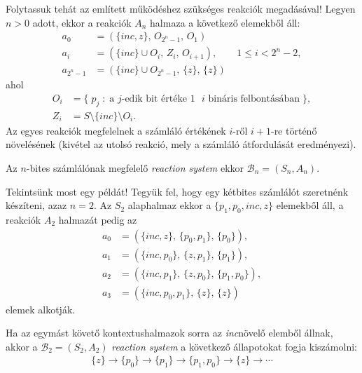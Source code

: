 \documentclass[12pt]{article}
\theoremstyle{definition}
\theoremstyle{remark}
\theoremstyle{plain}
\newcommand{\inc}{\textit{inc}}
\newcommand{\reaction}[3]{
    (#1, \, #2, \, #3)
}
\begin{document}
    Folytassuk tehát az említett működéshez szükséges reakciók megadásával! Legyen $n > 0$ adott, ekkor a reakciók $A_{n}$ halmaza a következő elemekből áll:
    \begin{align*}
        a_{0} &= \reaction{\{ \inc, z \}}{O_{2^{n}-1}}{O_{1}} \\
        a_{i} &= \reaction{\{ \inc \} \cup O_{i}}{Z_{i}}{O_{i + 1}}, \qquad 1 \leq i < 2^{n} - 2, \\
        a_{2^{n}-1} &= \reaction{\{ \inc \} \cup O_{2^{n} - 1}}{\{z\}}{\{z\}}
    \end{align*}
    ahol
    \begin{align*}
        O_{i} &= \{ \; p_{j} \; : \; \text{a $j$-edik bit értéke $1$ $i$ bináris felbontásában} \; \}, \\
        Z_{i} &= S \setminus\{ \inc \} \setminus O_{i}.
    \end{align*}
    Az egyes reakciók megfelelnek a számláló értékének $i$-ről $i + 1$-re történő növelésének (kivétel az utolsó reakció, mely a számláló átfordulását eredményezi).

    Az $n$-bites számlálónak megfelelő \textit{reaction system} ekkor $\mathcal{B}_{n}=(S_{n}, A_{n})$.

    Tekintsünk most egy példát! Tegyük fel, hogy egy kétbites számlálót szeretnénk készíteni, azaz $n = 2$. Az $S_{2}$ alaphalmaz ekkor a $\{p_{1}, p_{0}, \inc, z \}$ elemekből áll, a reakciók $A_{2}$ halmazát pedig az
    \begin{align*}
        a_{0} &= \reaction{\{ \inc, z \}}{\{p_{0}, p_{1}\}}{\{ p_{0} \}}, \\
        a_{1} &= \reaction{\{ \inc, p_{0} \}}{\{ z, p_{1} \}}{\{ p_{1} \}}, \\
        a_{2} &= \reaction{\{ \inc, p_{1} \}}{\{ z, p_{0} \}}{\{ p_{1}, p_{0} \}}, \\
        a_{3} &= \reaction{\{ \inc, p_{0}, p_{1} \}}{\{z\}}{\{z\}}
    \end{align*}
    elemek alkotják.

    Ha az egymást követő kontextushalmazok sorra az \inc növelő elemből állnak, akkor a $\mathcal{B}_{2} = (S_{2}, A_{2})$ \textit{reaction system} a következő állapotokat fogja kiszámolni:
    \begin{align*}
        \{z\} \rightarrow \{p_{0}\} \rightarrow \{p_{1}\} \rightarrow \{p_{1}, p_{0}\} \rightarrow \{z\} \rightarrow \cdots
    \end{align*}
\end{document}
